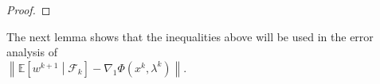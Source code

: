 \documentclass[10pt]{article}
\theoremstyle{remark}
\def\setF{\mathscr{F}} %
\newcommand{\E}{\mathbb{E}}
\newcommand{\norm}[1]{\left\|#1\right\|}
\begin{document}
\begin{proof}
\end{proof}
The next lemma shows that the inequalities above will be used in the error analysis of \\
$\norm{\E\left[w^{k+1}\middle|\setF_k\right] - \nabla_1\Phi(x^k, \lambda^k)}$. 
\end{document}
